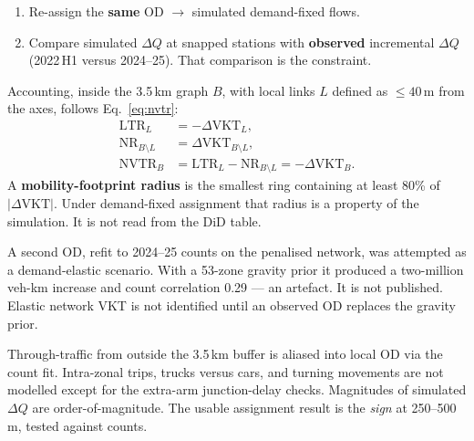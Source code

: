 \documentclass[a4paper,fleqn]{cas-dc}
\newcommand{\LTR}{\mathrm{LTR}}
\newcommand{\NR}{\mathrm{NR}}
\newcommand{\NVTR}{\mathrm{NVTR}}
\newcommand{\DQ}{\Delta Q}
\newcommand{\DVKT}{\Delta\mathrm{VKT}}
\begin{document}
\begin{enumerate}
onto the wrong streets. Directed treated length is 12.11\,km. Cost
$\times 10$, $\times 100$ and $\times 1{,}000$ produce the same all-or-nothing
flows. Gravity impedance $\beta \in \{1,2,3\}$ on those paths is reported in
Table~\ref{tab:spec}. Public OSM tags do not supply reliable link capacities
or signal timings on this extract, so user-equilibrium / BPR assignment is
not estimated; all-or-nothing is the demand-fixed limiting case
\citep{Wardrop1952}, the most concentrated allocation of leftover flow onto
shortest remaining paths. Uniform extra-arm node delays of 5, 10 and 80\,m are a
crude turn-cost proxy on the same OD (Table~\ref{tab:spec}, Panel~D).
\item Re-assign the \textbf{same} OD $\to$ simulated demand-fixed flows.
\item Compare simulated $\DQ$ at snapped stations with \textbf{observed}
incremental $\DQ$ (2022\,H1 versus 2024--25). That comparison is the
constraint.
\end{enumerate}

Accounting, inside the 3.5\,km graph $B$, with local links $L$ defined as
$\le 40$\,m from the axes, follows Eq.~\eqref{eq:nvtr}:
\begin{align}
\LTR_{L} &= -\DVKT_{L}, \nonumber \\
\NR_{B\setminus L} &= \DVKT_{B\setminus L}, \nonumber \\
\NVTR_{B} &= \LTR_{L} - \NR_{B\setminus L} = -\DVKT_{B}.
\end{align}
A \textbf{mobility-footprint radius} is the smallest ring containing at least
80\% of $|\DVKT|$. Under demand-fixed assignment that radius is a property of
the simulation. It is not read from the DiD table.

A second OD, refit to 2024--25 counts on the penalised network, was attempted
as a demand-elastic scenario. With a 53-zone gravity prior it produced a
two-million veh-km increase and count correlation 0.29 --- an artefact. It is
not published. Elastic network VKT is not identified until an observed OD
replaces the gravity prior.

Through-traffic from outside the 3.5\,km buffer is aliased into local OD via
the count fit. Intra-zonal trips, trucks versus cars, and turning movements
are not modelled except for the extra-arm junction-delay checks. Magnitudes of
simulated $\DQ$ are order-of-magnitude. The usable assignment result is the
\emph{sign} at 250--500\,m, tested against counts.

\end{document}
